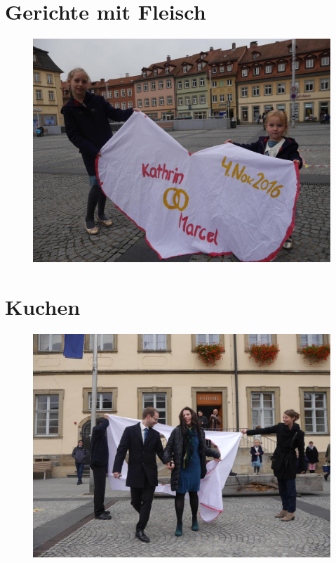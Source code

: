 \documentclass[%
a4paper,
twoside,
12pt
]{article}
\begin{document}
\begin{otherlanguage}{ngerman}
\section{Gerichte mit Fleisch}
\begin{figure}[h]
	\includegraphics[width=\textwidth]{pic/fleisch.jpg}
\end{figure}











\cleardoublepage
\section{Kuchen}
\begin{figure}[h]
	\includegraphics[width=\textwidth]{pic/kuchen.jpg}
\end{figure}


\end{otherlanguage}
\end{document}
